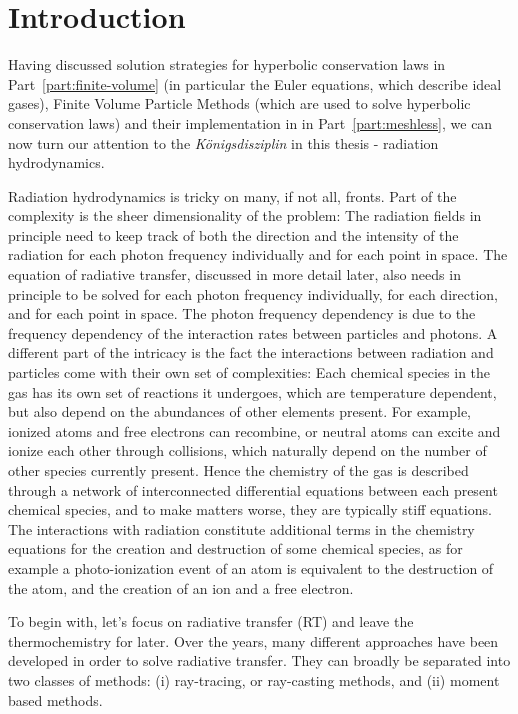 \chapter{Introduction}


Having discussed solution strategies for hyperbolic conservation laws in
Part~\ref{part:finite-volume} (in particular the Euler equations, which describe ideal gases),
Finite Volume Particle Methods (which are used to solve hyperbolic conservation laws) and their
implementation in \swift in Part~\ref{part:meshless}, we can now turn our attention to the
\emph{K\"onigsdisziplin} in this thesis - radiation hydrodynamics.

Radiation hydrodynamics is tricky on many, if not all, fronts. Part of the complexity is the sheer
dimensionality of the problem: The radiation fields in principle need to keep track of both the
direction and the intensity of the radiation for each photon frequency individually and for each
point in space. The equation of radiative transfer, discussed in more detail later, also needs in
principle to be solved for each photon frequency individually, for each direction, and for each
point in space. The photon frequency dependency is due to the frequency dependency of the
interaction rates between particles and photons. A different part of the intricacy is the fact the
interactions between radiation and particles come with their own set of complexities: Each chemical
species in the gas has its own set of reactions it undergoes, which are temperature dependent, but
also depend on the abundances of other elements present. For example, ionized atoms and free
electrons can recombine, or neutral atoms can excite and ionize each other through collisions, which naturally depend on the number of other species currently present. Hence
the chemistry of the gas is described through a network of interconnected differential equations
between each present chemical species, and to make matters worse, they are typically stiff
equations. The interactions with radiation constitute additional terms in the chemistry equations
for the creation and destruction of some chemical species, as for example a photo-ionization event of an atom is equivalent to the destruction of the atom, and the creation of an ion and a free
electron.

To begin with, let's focus on radiative transfer (RT) and leave the thermochemistry for later. Over the years, many different approaches have been developed in order to solve radiative transfer. They can broadly be separated into two classes of methods: (i) ray-tracing, or ray-casting methods, and (ii) moment based methods.

